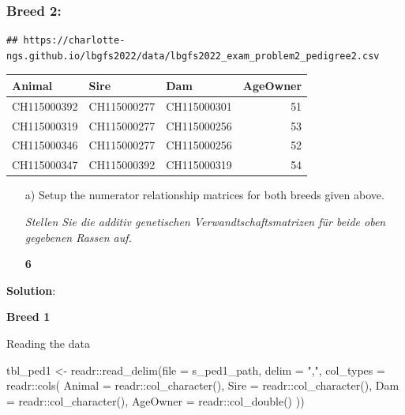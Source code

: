 \documentclass[
]{article}
\newenvironment{Shaded}{\begin{snugshade}}{\end{snugshade}}
\newcommand{\AttributeTok}[1]{\textcolor[rgb]{0.77,0.63,0.00}{#1}}
\newcommand{\FunctionTok}[1]{\textcolor[rgb]{0.00,0.00,0.00}{#1}}
\newcommand{\NormalTok}[1]{#1}
\newcommand{\OtherTok}[1]{\textcolor[rgb]{0.56,0.35,0.01}{#1}}
\newcommand{\SpecialCharTok}[1]{\textcolor[rgb]{0.00,0.00,0.00}{#1}}
\newcommand{\StringTok}[1]{\textcolor[rgb]{0.31,0.60,0.02}{#1}}
\newcommand{\points}[1]
{\begin{flushright}\textbf{#1}\end{flushright}}
\newcommand{\solstart}
{\vspace{3ex}\textbf{Solution}:}
\begin{document}
\hypertarget{breed-2}{%
\subsubsection{Breed 2:}\label{breed-2}}

\begin{verbatim}
## https://charlotte-ngs.github.io/lbgfs2022/data/lbgfs2022_exam_problem2_pedigree2.csv
\end{verbatim}

\begin{longtable}[]{@{}lllr@{}}
\toprule()
Animal & Sire & Dam & AgeOwner \\
\midrule()
\endhead
CH115000392 & CH115000277 & CH115000301 & 51 \\
CH115000319 & CH115000277 & CH115000256 & 53 \\
CH115000346 & CH115000277 & CH115000256 & 52 \\
CH115000347 & CH115000392 & CH115000319 & 54 \\
\bottomrule()
\end{longtable}

\clearpage
\pagebreak

\begin{enumerate}
\item[a)] Setup the numerator relationship matrices for both breeds given above. 

\textit{Stellen Sie die additiv genetischen Verwandtschaftsmatrizen für beide oben gegebenen Rassen auf.}
\points{6}
\end{enumerate}

\vspace{3ex}
\solstart

\textbf{Breed 1}

Reading the data

\begin{Shaded}
\begin{Highlighting}[]
\NormalTok{tbl\_ped1 }\OtherTok{\textless{}{-}}\NormalTok{ readr}\SpecialCharTok{::}\FunctionTok{read\_delim}\NormalTok{(}\AttributeTok{file =}\NormalTok{ s\_ped1\_path,}
                              \AttributeTok{delim =} \StringTok{","}\NormalTok{,}
                              \AttributeTok{col\_types =}\NormalTok{ readr}\SpecialCharTok{::}\FunctionTok{cols}\NormalTok{(}
                                \AttributeTok{Animal =}\NormalTok{ readr}\SpecialCharTok{::}\FunctionTok{col\_character}\NormalTok{(),}
                                \AttributeTok{Sire =}\NormalTok{ readr}\SpecialCharTok{::}\FunctionTok{col\_character}\NormalTok{(),}
                                \AttributeTok{Dam =}\NormalTok{ readr}\SpecialCharTok{::}\FunctionTok{col\_character}\NormalTok{(),}
                                \AttributeTok{AgeOwner =}\NormalTok{ readr}\SpecialCharTok{::}\FunctionTok{col\_double}\NormalTok{()}
\NormalTok{                              ))}
\end{Highlighting}
\end{Shaded}
\end{document}

